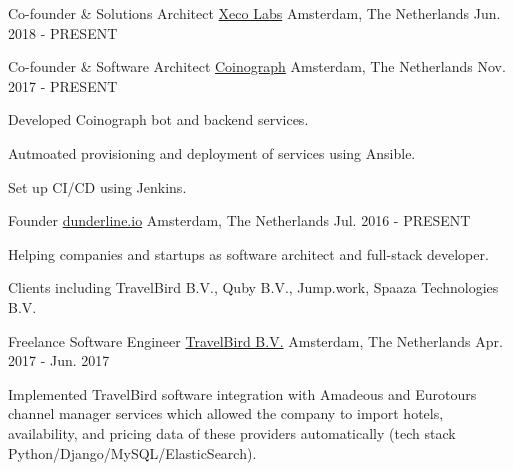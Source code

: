 

\begin{cventries}

  \cventry
    {Co-founder \& Solutions Architect} %
    {\href{https://www.xecolabs.com}{Xeco Labs}} %
    {Amsterdam, The Netherlands} %
    {Jun. 2018 - PRESENT} %
    {}

  \cventry
    {Co-founder \& Software Architect} %
    {\href{https://www.coinograph.io}{Coinograph}} %
    {Amsterdam, The Netherlands} %
    {Nov. 2017 - PRESENT} %
    {
      \begin{cvitems} %
      \item {Developed Coinograph bot and backend services.}
      \item {Autmoated provisioning	and deployment of services using Ansible.}
      \item {Set up CI/CD using Jenkins.}	
      \end{cvitems}
    }

  \cventry
    {Founder} %
    {\href{https://www.dunderline.io/}{dunderline.io}} %
    {Amsterdam, The Netherlands} %
    {Jul. 2016 - PRESENT} %
    {
      \begin{cvitems} %
        \item {Helping companies and startups as software architect and full-stack developer.}
        \item {Clients including TravelBird B.V., Quby B.V., Jump.work, Spaaza Technologies B.V.}
      \end{cvitems}
    }

  \cventry
    {Freelance Software Engineer} %
    {\href{https://travelbird.nl/}{TravelBird B.V.}} %
    {Amsterdam, The Netherlands} %
    {Apr. 2017 - 	Jun. 2017} %
    {
      \begin{cvitems} %
        \item {Implemented TravelBird software integration with Amadeous and Eurotours channel manager services which allowed the company to import hotels, availability, and pricing data of these providers automatically (tech stack Python/Django/MySQL/ElasticSearch).}
      \end{cvitems}
    }


\end{cventries}
